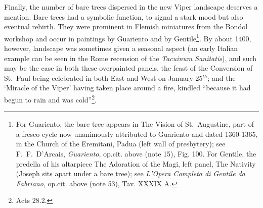 \documentclass[a4paper,12pt]{article}
\begin{document}
Finally, the number of bare trees dispersed in the new Viper landscape
deserves a mention. Bare trees had a symbolic function, to signal a
stark mood but also eventual rebirth. They were prominent in Flemish
miniatures from the Bondol workshop and occur in paintings by
Guariento and by Gentile\footnote{For Guariento, the bare tree appears
in The Vision of St.~Augustine, part of a fresco cycle now unanimously
attributed to Guariento and dated 1360-1365, in the Church of the
Eremitani, Padua (left wall of presbytery); see F.~F.~D'Arcais,
\textit{Guariento}, op.cit. above (note 15), Fig. 100.  For Gentile,
the predella of his altarpiece The Adoration of the Magi, left panel,
The Nativity (Joseph sits apart under a bare tree); see
\textit{L'Opera Completa di Gentile da Fabriano}, op.cit. above (note
53), Tav. XXXIX A.}.  By about 1400, however, landscape was sometimes
given a seasonal aspect (an early Italian example can be seen in the
Rome recension of the \textit{Tacuinum Sanitatis}), and such may be
the case in both these overpainted panels, the feast of the Conversion
of St.~Paul being celebrated in both East and West on January
25$^{th}$; and the `Miracle of the Viper' having taken place around a
fire, kindled ``because it had begun to rain and was
cold''\footnote{Acts 28.2.}.
\end{document}
